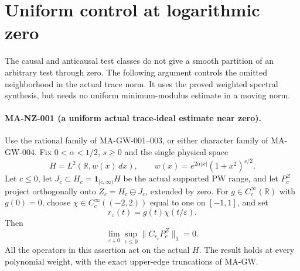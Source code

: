 \section{Uniform control at logarithmic zero}
\label{sec:near-zero-trace}

The causal and anticausal test classes do not give a smooth
partition of an arbitrary test through zero.  The following
argument controls the omitted neighborhood in the actual
trace norm.  It uses the proved weighted spectral synthesis,
but needs no uniform minimum-modulus estimate in a moving norm.

\paragraph{MA-NZ-001 (a uniform actual trace-ideal estimate near zero).}
Use the rational family of MA-GW-001--003, or either character
family of MA-GW-004.  Fix $0<\alpha<1/2$, $s\ge0$ and the
single physical space
\[
 H=L^2(\mathbb R,w(x)\,dx),\qquad
 w(x)=e^{2\alpha|x|}(1+x^2)^{s/2}.
 \tag{MA-NZ.1}
\]
Let $c\le0$, let $J_c\subset H_c=\mathbf1_{[c,\infty)}H$
be the actual supported PW range, and let $P_c^Z$ project
orthogonally onto $Z_c=H_c\ominus J_c$, extended by zero.
For $g\in C_c^\infty(\mathbb R)$ with $g(0)=0$, choose
$\chi\in C_c^\infty((-2,2))$ equal to one on $[-1,1]$, and set
\[
                 r_\varepsilon(t)=g(t)\chi(t/\varepsilon).
 \tag{MA-NZ.2}
\]
Then
\[
       \lim_{\varepsilon\downarrow0}
       \sup_{c\le0}\|C_{r_\varepsilon}P_c^Z\|_1=0.
 \tag{MA-NZ.3}
\]
All the operators in this assertion act on the actual $H$.
The result holds at every polynomial weight, with the exact
upper-edge truncations of MA-GW.

